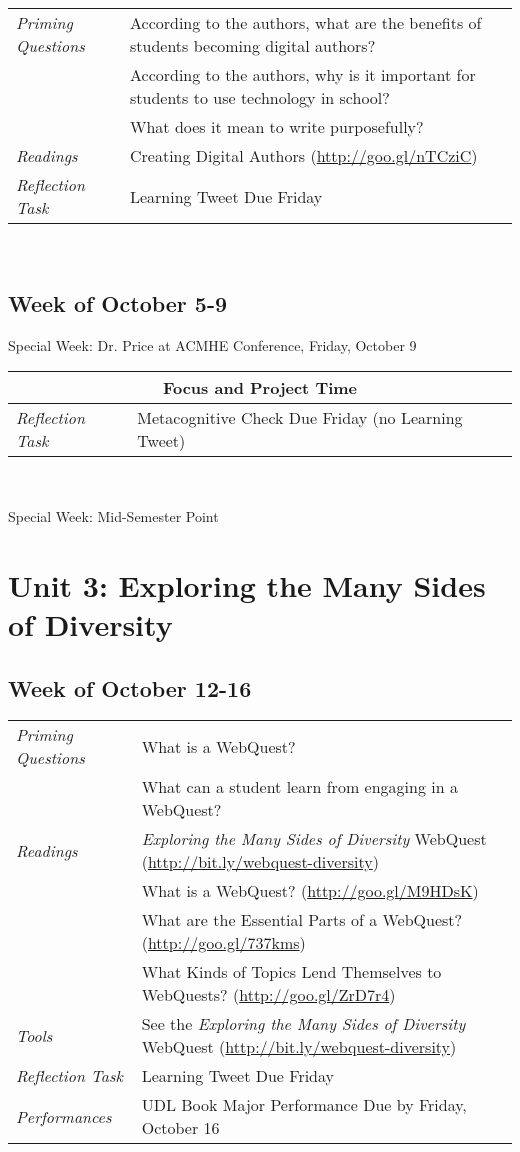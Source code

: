 \documentclass{tufte-handout}
\newcommand{\tabpq}{\faQuestionCircle\medspace\textit{Priming Questions}}
\newcommand{\tabread}{\faBook\medspace\textit{Readings}}
\newcommand{\tabperformance}{\faTasks\medspace\textit{Performances}}
\newcommand{\tabtools}{\faWrench\medspace\textit{Tools}}
\newcommand{\tabtweet}{\faLightbulbO\medspace\textit{Reflection Task} & Learning Tweet Due Friday \\}
\newcommand{\tabcheck}{\faLightbulbO\medspace\textit{Reflection Task} & Metacognitive Check Due Friday (no Learning Tweet) \\}
\newenvironment{tabsched}
	{\small
	\begin{tabular}{p{1.5in}p{4.5in}}
	\toprule}
	{\bottomrule
	\end{tabular}
	\normalsize\\}
\newenvironment{specweek}
	{\begin{center}
		\fontseries{b} \faBullhorn \medspace Special Week: }
		{\medspace \faBullhorn \fontseries{m}
	\end{center}}
\newcommand{\weekeight}{October 5-9}
\newcommand{\weeknine}{October 12-16}
\newcommand{\midsemester}{Mid-Semester Point}
\newcommand{\acmhe}{Dr. Price at ACMHE Conference, Friday, October 9}
\begin{document}
\begin{fullwidth}
\begin{tabsched}
	\tabpq & According to the authors, what are the benefits of students becoming digital authors? \\
	& According to the authors, why is it important for students to use technology in school? \\
	& What does it mean to write purposefully? \\
	\midrule
	\tabread & Creating Digital Authors (\url{http://goo.gl/nTCziC}) \\
	\midrule
	\tabtweet
\end{tabsched}

\subsection{Week of \weekeight}

\begin{specweek}\acmhe\end{specweek}

\begin{tabsched}
	\multicolumn{2}{c}{\faLaptop\medspace\textbf{Focus and Project Time}\medspace\faLaptop} \\
	\midrule
	\tabcheck
\end{tabsched}

\begin{specweek}\midsemester\end{specweek}

\section{Unit 3: Exploring the Many Sides of Diversity}

\subsection{Week of \weeknine}

\begin{tabsched}
	\tabpq & What is a WebQuest? \\
	& What can a student learn from engaging in a WebQuest? \\
	\midrule
	\tabread & \textit{Exploring the Many Sides of Diversity} WebQuest (\url{http://bit.ly/webquest-diversity})\\
	&  What is a WebQuest? (\url{http://goo.gl/M9HDsK}) \\
	& What are the Essential Parts of a WebQuest? (\url{http://goo.gl/737kms}) \\
	& What Kinds of Topics Lend Themselves to WebQuests? (\url{http://goo.gl/ZrD7r4}) \\
	\midrule
	\tabtools & See the \textit{Exploring the Many Sides of Diversity} WebQuest (\url{http://bit.ly/webquest-diversity}) \\
	\midrule
	\tabtweet
	\midrule
	\tabperformance & UDL Book Major Performance Due by Friday, October 16 \\
\end{tabsched}


\end{fullwidth}
\end{document}
